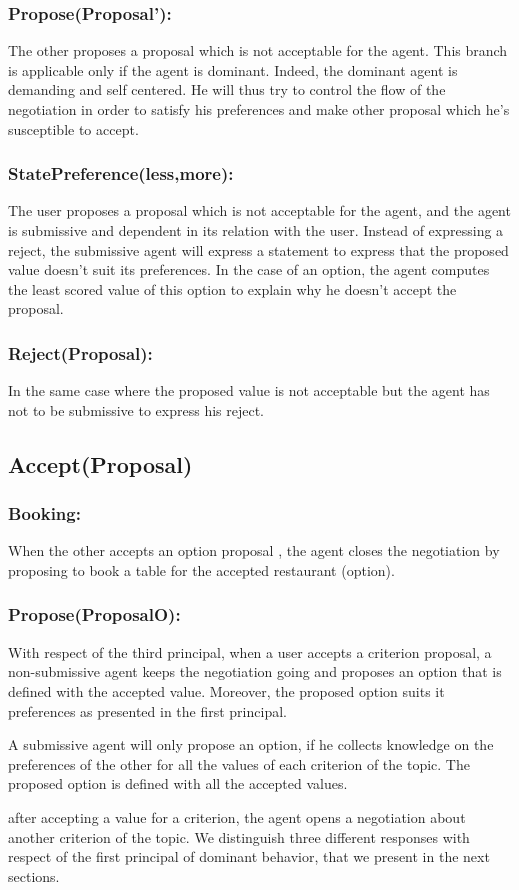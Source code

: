 \documentclass{llncs}
\begin{document}
 
 \subsubsection{Propose(Proposal'):} The other proposes a proposal which is not acceptable for the agent. This branch is applicable only if the agent is dominant. Indeed, the dominant agent is demanding and self centered. He will thus try to control the flow of the negotiation in order to satisfy his preferences and  make other proposal which he's susceptible to accept.
 
 \subsubsection{StatePreference(less,more):} The user proposes a proposal which is not acceptable for the agent, and the agent is submissive and dependent in its relation with the user. Instead of expressing a reject, the submissive agent will express a statement to express that the proposed value doesn't suit its preferences. In the case of an option, the agent computes the least scored value of this option to explain why he doesn't accept the proposal.
 
 \subsubsection{Reject(Proposal):} In the same case where the proposed value is not acceptable but the agent has not to be submissive to express his reject.
 
 \subsection{Accept(Proposal)}
 \subsubsection{Booking: } When the other accepts an option proposal , the agent closes the negotiation by proposing to book a table for the accepted restaurant (option).
 
 \subsubsection{Propose(ProposalO):} With respect of the third principal, when a user accepts a criterion proposal, a non-submissive agent keeps  the negotiation going and proposes an option that is defined with the accepted value. Moreover, the proposed option suits it preferences as presented in the first principal. 
 \par A submissive agent will only propose an option, if he collects knowledge on the preferences of the other for all the values of each criterion of the topic.  The proposed option is defined with all the accepted values.
 \par after accepting a value for a criterion, the agent opens a negotiation about another criterion of the topic. We distinguish three different responses with respect of the first principal of dominant behavior, that we present in the next sections.
 
\end{document}
